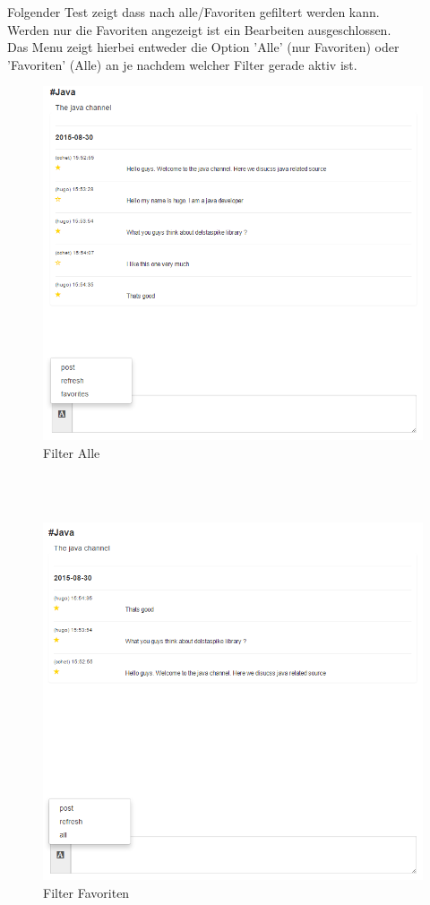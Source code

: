 \documentclass[11pt, a4paper, twoside]{article}   	%
\begin{document}
Folgender Test zeigt dass nach alle/Favoriten gefiltert werden kann.\\
Werden nur die Favoriten angezeigt ist ein Bearbeiten ausgeschlossen.\\
Das Menu zeigt hierbei entweder die Option 'Alle' (nur Favoriten) oder 'Favoriten' (Alle) an je nachdem welcher Filter gerade aktiv ist.
\begin{figure}[h]
	\centering
	\includegraphics[scale=0.4]{images/start_channel_chat_all.PNG}
	\caption
	{Filter Alle}
\end{figure}\\\\
\begin{figure}[h]
	\centering
	\includegraphics[scale=0.4]{images/start_channel_chat_favorites_only.PNG}
	\caption
	{Filter Favoriten}
\end{figure}\\\\
\newpage
\end{document}
